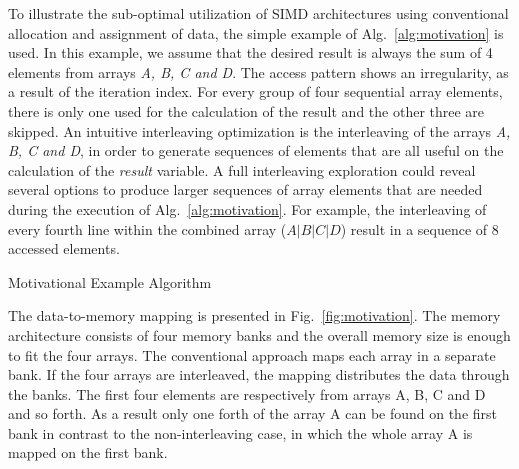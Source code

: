 \documentclass[prodmode,acmtodaes]{acmsmall}
\begin{document}
To illustrate the sub-optimal utilization of SIMD architectures using conventional allocation and assignment of data, the simple example of Alg.~\ref{alg:motivation} is used.
In this example, we assume that the desired result is always the sum of 4 elements from arrays \textit{A, B, C and D}. 
The access pattern shows an irregularity, as a result of the iteration index.
For every group of four sequential array elements, there is only one used for the calculation of the result and the other three are skipped.
An intuitive interleaving optimization is the interleaving of the arrays \textit{A, B, C and D}, in order to generate sequences of elements that are all useful on the calculation of the \textit{result} variable. 
A full interleaving exploration could reveal several options to produce larger sequences of array elements that are needed during the execution of Alg.~\ref{alg:motivation}.
For example, the interleaving of every fourth line within the combined array ($A\vert B\vert C\vert D$) result in a sequence of 8 accessed elements.

\begin{algorithm}[t]
\SetAlgoNoLine
{}
\caption{Motivational Example Algorithm}
\label{alg:motivation}
\end{algorithm}

The data-to-memory mapping is presented in Fig.~\ref{fig:motivation}. 
The memory architecture consists of four memory banks and the overall memory size is enough to fit the four arrays.
The conventional approach maps each array in a separate bank.
If the four arrays are interleaved, the mapping distributes the data through the banks.
The first four elements are respectively from arrays A, B, C and D and so forth.
As a result only one forth of the array A can be found on the first bank in contrast to the non-interleaving case, in which the whole array A is mapped on the first bank.
\end{document}
